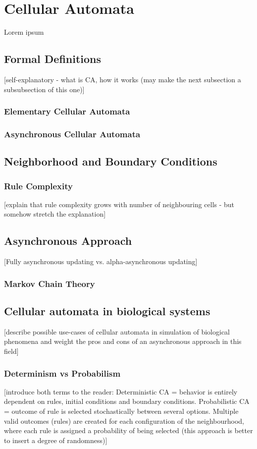\documentclass[../projekt.tex]{subfiles}
\begin{document}

\chapter{Cellular Automata}
\label{chap-ca}

Lorem ipsum

\section{Formal Definitions}
[self-explanatory - what is CA, how it works (may make the next subsection a subsubsection of this one)]
\subsection{Elementary Cellular Automata}
\subsection{Asynchronous Cellular Automata}

\section{Neighborhood and Boundary Conditions}
\subsection{Rule Complexity}
[explain that rule complexity grows with number of neighbouring cells - but somehow stretch the explanation]

\section{Asynchronous Approach}
[Fully asynchronous updating vs. alpha-asynchronous updating]
\subsection{Markov Chain Theory}

\section{Cellular automata in biological systems}
[describe possible use-cases of cellular automata in simulation of biological phenomena and weight the pros and cons of an 
asynchronous approach in this field]
\subsection{Determinism vs Probabilism}
[introduce both terms to the reader: Deterministic CA = behavior is entirely dependent on rules, initial conditions and boundary 
conditions. Probabilistic CA = outcome of rule is selected stochastically between several options. Multiple valid outcomes (rules) are 
created for each configuration of the neighbourhood, where each rule is assigned a probability of being selected (this approach is 
better to insert a degree of randomness)]

\end{document}
